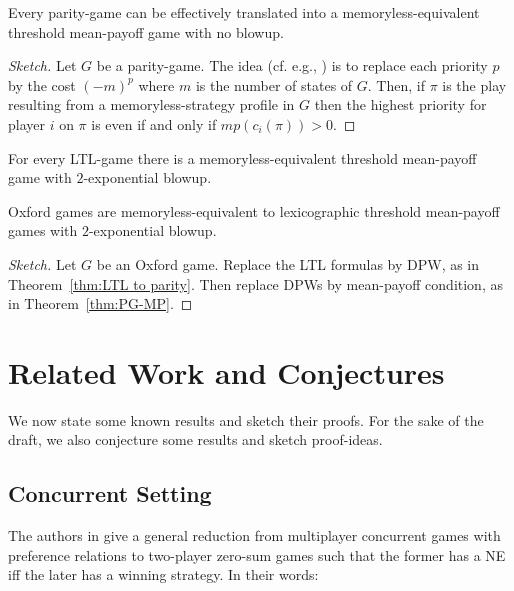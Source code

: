\begin{theorem} \label{thm:PG-MP}
Every parity-game can be effectively translated into a memoryless-equivalent threshold mean-payoff game with no blowup.
\end{theorem}

\begin{proof}[Sketch]
Let $G$ be a parity-game. The idea (cf. e.g., \cite{Jurd98}) is to replace each priority $p$ by the cost $(-m)^p$ where $m$ is 
the number of states of $G$. Then, if $\pi$ is the play resulting from a memoryless-strategy profile in $G$ then the highest priority for player $i$ on $\pi$ is even 
if and only if $mp(c_i(\pi)) > 0$.
\end{proof}


\begin{corollary}
 For every LTL-game there is a memoryless-equivalent threshold mean-payoff game with $2$-exponential blowup.
\end{corollary}


\begin{conjecture} \label{conj:oxford-mp}
Oxford games are memoryless-equivalent to lexicographic threshold mean-payoff games with $2$-exponential blowup.
\end{conjecture}
\begin{proof}[Sketch]
 Let $G$ be an Oxford game. Replace the LTL formulas by DPW, as in Theorem~\ref{thm:LTL to parity}. Then replace DPWs by mean-payoff condition, as in Theorem~\ref{thm:PG-MP}.
\end{proof}




\section{Related Work and Conjectures}

We now state some known results and sketch their proofs. For the sake of the draft, we also
conjecture some results and sketch proof-ideas.

\subsection{Concurrent Setting}
The authors in \cite{DBLP:journals/corr/BouyerBMU15} give a general reduction from multiplayer concurrent games with preference relations to two-player zero-sum games such that the former has a NE
iff the later has a winning strategy. In their words:

